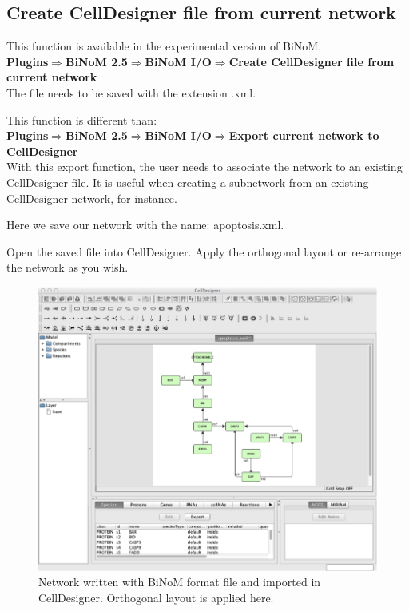 \subsection{Create CellDesigner file from current network}
This function is available in the experimental version of BiNoM. \\
\textbf{Plugins$\Rightarrow$BiNoM 2.5$\Rightarrow$BiNoM I/O$\Rightarrow$Create CellDesigner file from current network}\\

The file needs to be saved with the extension .xml.


This function is different than:\\
\textbf{Plugins$\Rightarrow$BiNoM 2.5$\Rightarrow$BiNoM I/O$\Rightarrow$Export current network to CellDesigner}\\
With this export function, the user needs to associate the network to an existing CellDesigner file. It is useful when creating a subnetwork from an existing CellDesigner network, for instance.

Here we save our network with the name: apoptosis.xml.

Open the saved file into CellDesigner. Apply the orthogonal layout or re-arrange the network as you wish.


\begin{figure}
\includegraphics{graphics/Import_CD_brff.png}
\caption{Network written with BiNoM format file and imported in CellDesigner. Orthogonal layout is applied here.}
\label{import_CD}
\end{figure}

